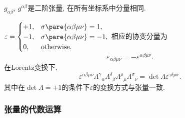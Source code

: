 \documentclass[hidelinks]{ctexart}
\begin{document}
\begin{sample}
    \begin{ex}
        $g_{\alpha\beta}$, $g^{\alpha\beta}$是二阶张量, 在所有坐标系中分量相同.
    \end{ex}
\end{sample}
\begin{sample}
    \begin{ex}
        $\displaystyle \varepsilon = \begin{cases}
            +1,& \sigma\pare{\alpha\beta\mu\nu} = 1, \\
            -1,& \sigma\pare{\alpha\beta\mu\nu} = -1, \\
            0, & \mathrm{otherwise}.
        \end{cases}$ 相应的协变分量为
        \[ \varepsilon_{\alpha\beta\mu\nu} = -\varepsilon^{\alpha\beta\mu\nu}. \]
        在Lorentz变换下,
        \[ \varepsilon^{\alpha\beta\mu\nu} {\Lambda^\gamma}_\alpha {\Lambda^\delta}_\beta {\Lambda^\rho}_\mu {\Lambda^\sigma}_\nu = \det \Lambda \varepsilon^{\gamma\delta\rho\sigma}. \]
        其中在$\det\Lambda = +1$的条件下$\varepsilon$的变换方式与张量一致.
    \end{ex}
\end{sample}


\subsubsection{张量的代数运算} %
\label{ssub:张量的代数运算}
\end{document}
